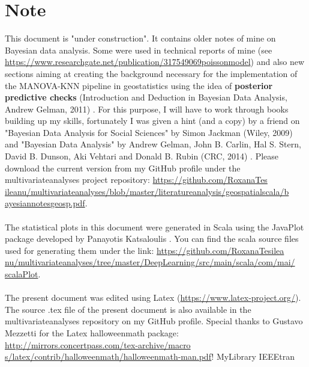 \documentclass {article}
\begin{document}
  

\section* {Note}
This document is "under construction".
 It contains older notes of mine on Bayesian data analysis.
 Some were used in technical reports of mine (see \href{https://www.researchgate.net/publication/317549069_poisson_model}{https://www.researchgate.net/publication/317549069\underline{\space}poisson\underline{\space}model}) and also new sections aiming at creating the background necessary for the implementation of the MANOVA-KNN pipeline in geostatistics using the idea of \textbf{posterior predictive checks} (Introduction and Deduction in Bayesian Data Analysis, Andrew Gelman, 2011) \cite{gelman_introduction_2011}.
 For this purpose, I will have to work through books building up my skills, fortunately I was given a hint (and a copy) by a friend on "Bayesian Data Analysis for Social Sciences" by Simon Jackman (Wiley, 2009) \cite{jackman_bayesian_2009} and "Bayesian Data Analysis" by Andrew Gelman, John B. Carlin, Hal S. Stern, David B. Dunson, Aki Vehtari and Donald B. Rubin (CRC, 2014) \cite{gelman_bayesian_2014}.    
Please download the current version from  my GitHub profile under the multivariate\underline{\space}analyses project repository: \href{https://github.com/RoxanaTesileanu/multivariate_analyses/blob/master/literature_analysis/geospatial_scala/bayesian_notes_geosp.tex}{https://github.com/RoxanaTes\\ileanu/multivariate\underline{\space}analyses/blob/master/literature\underline{\space}analysis/geospatial\underline{\space}scala/b\\ayesian\underline{\space}notes\underline{\space}geosp.pdf}. 
\\
\\
The statistical plots in this document were generated in Scala using the JavaPlot package developed by Panayotis Katsaloulis \cite{panayotis_javaplot_2017}. You can find the scala source files used for generating them under the link: 
\href{https://github.com/RoxanaTesileanu/multivariate_analyses/tree/master/DeepLearning/src/main/scala/com/mai/scalaPlot}{https://github.com/RoxanaTesilea\\nu/multivariate\underline{\space}analyses/tree/master/DeepLearning/src/main/scala/com/mai/\\scalaPlot}.  
\\
\\
The present document was edited using Latex \cite{claudio_latex-tutorial.com_nodate} (\href{https://www.latex-project.org/}{https://www.latex-project.org/}). The source .tex file of the present document is also available in the multivariate\underline{\space}analyses repository on my GitHub profile. Special thanks to Gustavo Mezzetti for the Latex halloweenmath package:
\href{http://mirrors.concertpass.com/tex-archive/macros/latex/contrib/halloweenmath/halloweenmath-man.pdf}{http://mirrors.concertpass.com/tex-archive/macro\\s/latex/contrib/halloweenmath/halloweenmath-man.pdf}!  
 {MyLibrary}
 {IEEEtran}
\end{document}
